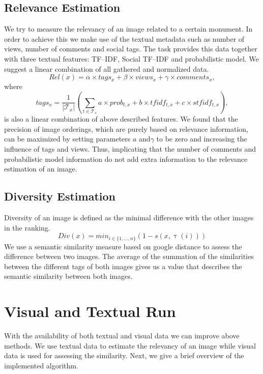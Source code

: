 \documentclass{acm_proc_article-me11_tweaked}
\begin{document}
\subsection{Relevance Estimation}
\label{text-relevance}
We try to measure the relevancy of an image related to a certain monument.
In order to achieve this we make use of the textual metadata such as number of views, number of comments and social tags.
The task provides this data together with three textual features: TF--IDF, Social TF--IDF and probabilistic model.
We suggest a linear combination of all gathered and normalized data.
$$
Rel(x) = \alpha \times tags_x + \beta \times views_x + \gamma \times comments_x,
$$
where
$$
tags_x = \frac{1}{|\mathscr{T}_x|} \left( \sum_{t \in \mathscr{T}_x} a\times prob_{t,x} + b\times tfidf_{t,x} + c\times stfidf_{t,x}\right), 
$$
is also a linear combination of above described features.
We found that the precision of image orderings, which are purely based on relevance information, can be maximized by setting parameters $a$ and$\gamma$ to be zero and increasing the influence of tags and views.
Thus, implicating that the number of comments and probabilistic model information do not add extra information to the relevance estimation of an image.




\subsection{Diversity Estimation}
Diversity of an image is defined as the minimal difference with the other images in the ranking.
$$Div(x) = min_{i \in \{1,\ldots,n\}}\left( 1 - s(x, \uptau(i))\right)$$
We use a semantic similarity measure based on google distance \cite{google-distance} to assess the difference between two images.
The average of the summation of the similarities between the different tags of both images gives us a value that describes the semantic similarity between both images.


\section{Visual and Textual Run}
With the availability of both textual and visual data we can improve above methods.
We use textual data to estimate the relevancy of an image while visual data is used for assessing the similarity.
Next, we give a brief overview of the implemented algorithm.
\end{document}
